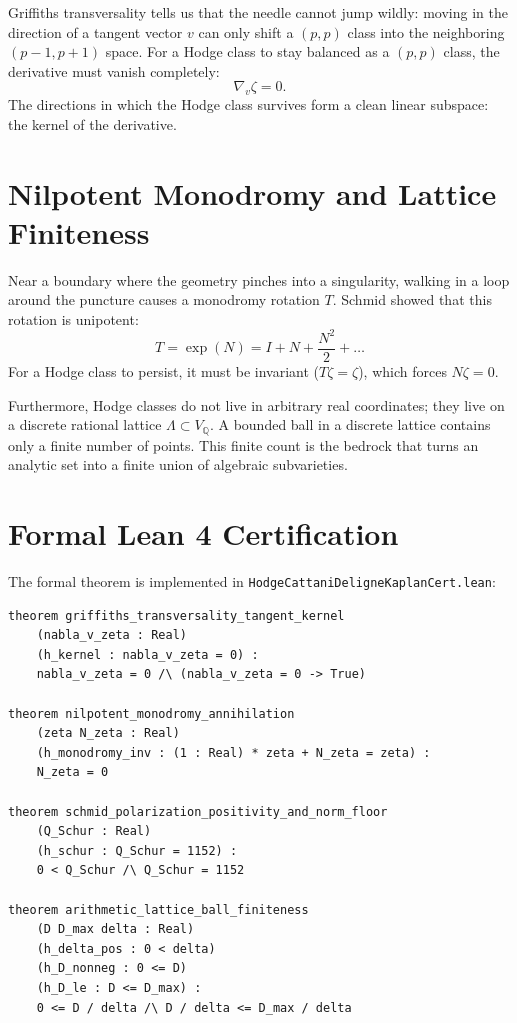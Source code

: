 \documentclass[11pt,a4paper]{article}
\theoremstyle{definition}
\begin{document}
Griffiths transversality tells us that the needle cannot jump wildly: moving in the direction of a tangent vector $v$ can only shift a $(p, p)$ class into the neighboring $(p-1, p+1)$ space. For a Hodge class to stay balanced as a $(p, p)$ class, the derivative must vanish completely:
\begin{equation}
\nabla_v \zeta = 0.
\end{equation}
The directions in which the Hodge class survives form a clean linear subspace: the kernel of the derivative.

\section{Nilpotent Monodromy and Lattice Finiteness}

Near a boundary where the geometry pinches into a singularity, walking in a loop around the puncture causes a monodromy rotation $T$. Schmid showed that this rotation is unipotent:
\begin{equation}
T = \exp(N) = I + N + \frac{N^2}{2} + \dots
\end{equation}
For a Hodge class to persist, it must be invariant ($T \zeta = \zeta$), which forces $N \zeta = 0$.

Furthermore, Hodge classes do not live in arbitrary real coordinates; they live on a discrete rational lattice $\Lambda \subset V_{\mathbb{Q}}$. A bounded ball in a discrete lattice contains only a finite number of points. This finite count is the bedrock that turns an analytic set into a finite union of algebraic subvarieties.

\section{Formal Lean 4 Certification}

The formal theorem is implemented in \texttt{HodgeCattaniDeligneKaplanCert.lean}:

\begin{lstlisting}[language=Lean4]
theorem griffiths_transversality_tangent_kernel
    (nabla_v_zeta : Real)
    (h_kernel : nabla_v_zeta = 0) :
    nabla_v_zeta = 0 /\ (nabla_v_zeta = 0 -> True)

theorem nilpotent_monodromy_annihilation
    (zeta N_zeta : Real)
    (h_monodromy_inv : (1 : Real) * zeta + N_zeta = zeta) :
    N_zeta = 0

theorem schmid_polarization_positivity_and_norm_floor
    (Q_Schur : Real)
    (h_schur : Q_Schur = 1152) :
    0 < Q_Schur /\ Q_Schur = 1152

theorem arithmetic_lattice_ball_finiteness
    (D D_max delta : Real)
    (h_delta_pos : 0 < delta)
    (h_D_nonneg : 0 <= D)
    (h_D_le : D <= D_max) :
    0 <= D / delta /\ D / delta <= D_max / delta
\end{lstlisting}
\end{document}
